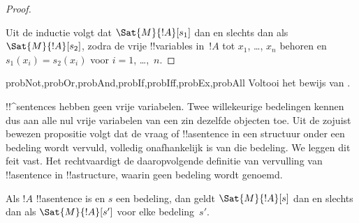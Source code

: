 \documentclass[../../../include/open-logic-section]{subfiles}
\begin{document}
\begin{proof}
\begin{enumerate}
\end{enumerate}
Uit de inductie volgt dat $\Sat{M}{!A}[s_1]$ dan en slechts dan als
$\Sat{M}{!A}[s_2]$, zodra de vrije !!{variable}s in~$!A$ tot
$x_1$, \dots, $x_n$ behoren en $s_1(x_i)=s_2(x_i)$ voor
$i = 1$, \dots,~$n$.
\end{proof}

\begin{probtag}{probNot,probOr,probAnd,probIf,probIff,probEx,probAll}
Voltooi het bewijs van .
\end{probtag}

\begin{explain}
!!^{sentence}s hebben geen vrije variabelen. Twee willekeurige
bedelingen kennen dus aan alle nul vrije variabelen van een zin
dezelfde objecten toe. Uit de zojuist bewezen propositie volgt dat de
vraag of !!a{sentence} in een structuur onder een bedeling wordt
vervuld, volledig onafhankelijk is van die bedeling. We leggen dit
feit vast. Het rechtvaardigt de daaropvolgende definitie van vervulling
van !!a{sentence} in !!a{structure}, waarin geen bedeling wordt genoemd.
\end{explain}

\begin{cor}
Als $!A$ !!a{sentence} is en $s$ een bedeling, dan geldt
$\Sat{M}{!A}[s]$ dan en slechts dan als $\Sat{M}{!A}[s']$ voor elke
bedeling~$s'$.
\end{cor}
\end{document}

